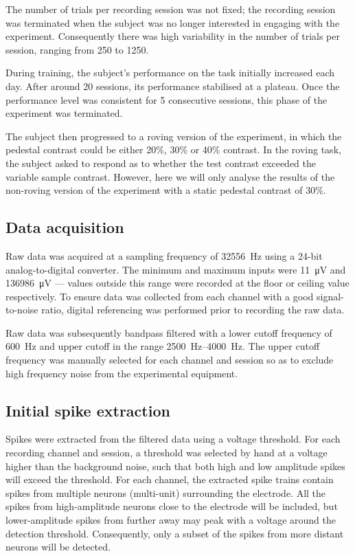 The number of trials per recording session was not fixed; the recording session was terminated when the subject was no longer interested in engaging with the experiment.
Consequently there was high variability in the number of trials per session, ranging from 250 to 1250.

During training, the subject's performance on the task initially increased each day.
After around 20 sessions, its performance stabilised at a plateau.
Once the performance level was consistent for 5 consecutive sessions, this phase of the experiment was terminated.

The subject then progressed to a roving version of the experiment, in which the pedestal contrast could be either 20\%, 30\% or 40\% contrast.
In the roving task, the subject asked to respond as to whether the test contrast exceeded the variable sample contrast.
However, here we will only analyse the results of the non-roving version of the experiment with a static pedestal contrast of 30\%.


\subsection{Data acquisition}

Raw data was acquired at a sampling frequency of \SI{32556}{Hz} using a 24-bit analog-to-digital converter.
The minimum and maximum inputs were \SI{11}{\micro\volt} and \SI{136986}{\micro\volt} --- values outside this range were recorded at the floor or ceiling value respectively.
To ensure data was collected from each channel with a good signal-to-noise ratio, digital referencing was performed prior to recording the raw data.

Raw data was subsequently bandpass filtered with a lower cutoff frequency of \SI{600}{Hz} and upper cutoff in the range \SIrange{2500}{4000}{Hz}.
The upper cutoff frequency was manually selected for each channel and session so as to exclude high frequency noise from the experimental equipment.


\subsection{Initial spike extraction}
\label{sec:pl_spike_extraction}

Spikes were extracted from the filtered data using a voltage threshold.
For each recording channel and session, a threshold was selected by hand at a voltage higher than the background noise, such that both high and low amplitude spikes will exceed the threshold.
For each channel, the extracted spike trains contain spikes from multiple neurons (multi-unit) surrounding the electrode.
All the spikes from high-amplitude neurons close to the electrode will be included, but lower-amplitude spikes from further away may peak with a voltage around the detection threshold.
Consequently, only a subset of the spikes from more distant neurons will be detected.

